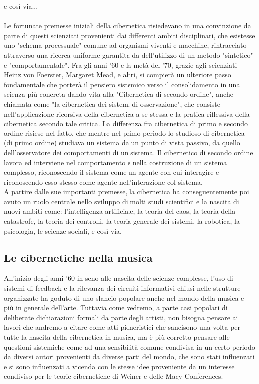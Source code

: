   e così via...
\\ \\
Le fortunate premesse iniziali della cibernetica risiedevano in una convinzione
da parte di questi scienziati provenienti dai differenti ambiti disciplinari,
che esistesse uno "schema processuale" comune ad organismi viventi e macchine,
rintracciato attraverso una ricerca uniforme
garantita da dell'utilizzo di un metodo
"sintetico" e "comportamentale".
Fra gli anni '60 e la metà del '70, grazie agli scienziati
Heinz von Foerster, Margaret Mead, e altri,
si compierà un ulteriore passo fondamentale che porterà
il pensiero sistemico verso il consolidamento in una scienza più concreta
dando vita alla "Cibernetica di secondo ordine",
anche chiamata come "la cibernetica dei sistemi di osservazione",
che consiste nell'applicazione
ricorsiva della cibernetica a se stessa e la pratica riflessiva della cibernetica
secondo tale critica.
La differenza fra cibernetica di primo e secondo ordine risiese nel fatto,
che mentre nel primo periodo lo studioso di cibernetica (di primo ordine)
studiava un sistema da un punto di vista passivo, da quello dell'osservatore
dei comportamenti di un sistema.
Il  cibernetico di secondo ordine lavora ed interviene nel comportamento
e nella costruzione di un sistema complesso,
riconoscendo il sistema come un agente con cui interagire e
riconoscendo esso stesso come agente nell'interazione col sistema. \\
A partire dalle sue importanti premesse,
la cibernetica ha conseguentemente poi avuto un ruolo centrale nello sviluppo di
molti studi scientifici e la nascita
di nuovi ambiti come: l'intelligenza artificiale, la teoria del caos,
la teoria della catastrofe,
la teoria dei controlli, la teoria generale dei sistemi, la robotica,
la psicologia, le scienze sociali, e così via.

\subsection{Le cibernetiche nella musica}
\label{sec:Le cibernetiche nella musica}
All'inizio degli anni '60 in seno alle nascita delle scienze complesse,
l'uso di sistemi di feedback e la rilevanza dei circuiti informativi chiusi
nelle strutture organizzate
ha goduto di uno slancio popolare anche nel mondo della musica
e più in generale dell'arte.
Tuttavia come vedremo, a parte casi popolari di deliberate dichiarazioni
formali da parte degli artisti, non bisogna pensare ai lavori che andremo a citare
come atti pioneristici che sancisono una volta per tutte la nascita della cibernetica in musica,
ma è più corretto pensare alle questioni sistemiche come ad una sensibilità
comune condivisa in un certo periodo da diversi autori provenienti da diverse parti del mondo,
che sono stati influenzati e si sono influenzati a vicenda
con le stesse idee proveniente da un interesse condiviso per
le teorie cibernetiche di Weiner e delle Macy Conferences.


